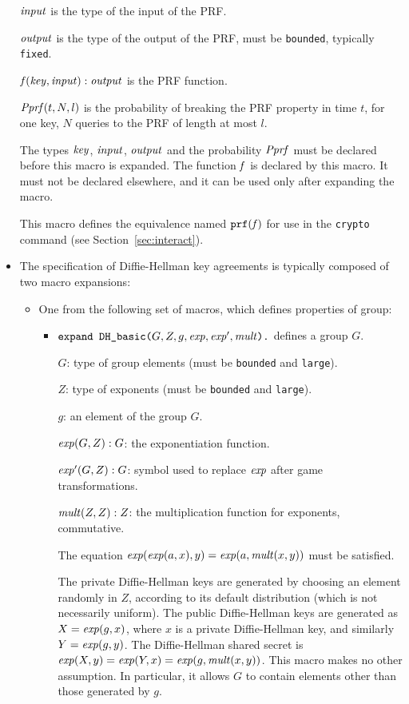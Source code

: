 \documentclass{article}
\begin{document}
\begin{itemize}
   $\mathit{input}$ is the type of the input of the PRF.

   $\mathit{output}$ is the type of the output of the PRF, must be \texttt{bounded}, typically \texttt{fixed}.

   $\mathit{f}(\mathit{key}, \mathit{input}):\mathit{output}$ is the PRF function.

   $\mathit{Pprf}(t, N, l)$ is the probability of breaking the PRF property
   in time $t$, for one key, $N$ queries to the PRF of length at most $l$.

   The types $\mathit{key}$, $\mathit{input}$, $\mathit{output}$
   and the probability $\mathit{Pprf}$ must be declared before this macro
   is expanded. The function $\mathit{f}$ is declared by
   this macro. It must not be declared elsewhere, and it can be
   used only after expanding the macro.

   This macro defines the equivalence named $\texttt{prf}(\mathit{f})$
   for use in the \texttt{crypto} command 
   (see Section~\ref{sec:interact}).

 \item The specification of Diffie-Hellman key agreements is typically composed of two macro expansions:

   \begin{itemize}
   \item One from the following set of macros, which defines properties of group:
     \begin{itemize}
     \item $\texttt{expand\ DH\_basic(}G, Z, g, \mathit{exp}, \mathit{exp}', \mathit{mult}\texttt{).}$ defines a group $G$.

       $G$: type of group elements (must be \texttt{bounded} and \texttt{large}).

       $Z$: type of exponents (must be \texttt{bounded} and
       \texttt{large}). 
       
       $g$: an element of the group $G$.

       $\mathit{exp}(G, Z): G$: the exponentiation function.  
       
       $\mathit{exp}'(G, Z): G$: symbol used to replace $\mathit{exp}$ after game transformations.

       $\mathit{mult}(Z, Z): Z$: the multiplication function for exponents, commutative.

       The equation $\mathit{exp}(\mathit{exp}(a,x), y) = \mathit{exp}(a,
       \mathit{mult}(x,y))$ must be satisfied.

       The private Diffie-Hellman keys are generated by choosing an
       element randomly in $Z$, according to its default distribution
       (which is not necessarily uniform). The public Diffie-Hellman
       keys are generated as $X = \mathit{exp}(g,x)$, where $x$ is a
       private Diffie-Hellman key, and similarly $Y =
       \mathit{exp}(g,y)$. The Diffie-Hellman shared secret is
       $\mathit{exp}(X,y) = \mathit{exp}(Y,x) = \mathit{exp}(g,\mathit{mult}(x,y))$.
       This macro makes no other assumption. In particular, it allows
       $G$ to contain elements other than those generated by $g$.


\end{itemize}
\end{itemize}
\end{itemize}
\end{document}
